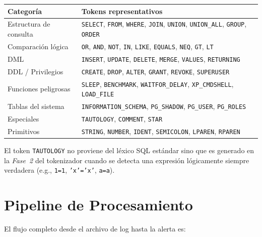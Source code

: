 \documentclass[12pt, a4paper]{report}
\theoremstyle{definition}
\theoremstyle{remark}
\newcommand{\tok}[1]{\texttt{\color{codeblue}#1}}
\begin{document}
\begin{center}
\begin{tabularx}{\textwidth}{lX}
  \toprule
  \textbf{Categoría} & \textbf{Tokens representativos} \\
  \midrule
  Estructura de consulta & \tok{SELECT}, \tok{FROM}, \tok{WHERE}, \tok{JOIN},
                           \tok{UNION}, \tok{UNION\_ALL}, \tok{GROUP}, \tok{ORDER} \\
  Comparación lógica     & \tok{OR}, \tok{AND}, \tok{NOT}, \tok{IN}, \tok{LIKE},
                           \tok{EQUALS}, \tok{NEQ}, \tok{GT}, \tok{LT} \\
  DML                    & \tok{INSERT}, \tok{UPDATE}, \tok{DELETE}, \tok{MERGE},
                           \tok{VALUES}, \tok{RETURNING} \\
  DDL / Privilegios      & \tok{CREATE}, \tok{DROP}, \tok{ALTER}, \tok{GRANT},
                           \tok{REVOKE}, \tok{SUPERUSER} \\
  Funciones peligrosas   & \tok{SLEEP}, \tok{BENCHMARK}, \tok{WAITFOR\_DELAY},
                           \tok{XP\_CMDSHELL}, \tok{LOAD\_FILE} \\
  Tablas del sistema     & \tok{INFORMATION\_SCHEMA}, \tok{PG\_SHADOW},
                           \tok{PG\_USER}, \tok{PG\_ROLES} \\
  Especiales             & \tok{TAUTOLOGY}, \tok{COMMENT}, \tok{STAR} \\
  Primitivos             & \tok{STRING}, \tok{NUMBER}, \tok{IDENT},
                           \tok{SEMICOLON}, \tok{LPAREN}, \tok{RPAREN} \\
  \bottomrule
\end{tabularx}
\end{center}

El token \tok{TAUTOLOGY} no proviene del léxico SQL estándar sino que es
generado en la \emph{Fase~2} del tokenizador cuando se detecta una expresión
lógicamente siempre verdadera (e.g., \texttt{1=1}, \texttt{'x'='x'}, \texttt{a=a}).

\section{Pipeline de Procesamiento}

El flujo completo desde el archivo de log hasta la alerta es:
\end{document}
